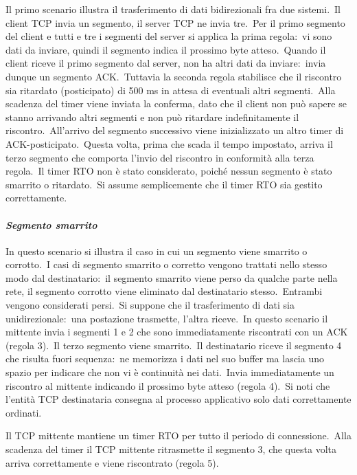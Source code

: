 Il primo scenario illustra il trasferimento di dati bidirezionali fra due sistemi.\
Il client TCP invia un segmento, il server TCP ne invia tre.\
Per il primo segmento del client e tutti e tre i segmenti del server si applica la prima regola:\ vi sono dati da inviare, quindi il segmento indica il prossimo byte atteso.\
Quando il client riceve il primo segmento dal server, non ha altri dati da inviare:\ invia dunque un segmento ACK.\
Tuttavia la seconda regola stabilisce che il riscontro sia ritardato (posticipato) di 500 ms in attesa di eventuali altri segmenti.\
Alla scadenza del timer viene inviata la conferma, dato che il client non può sapere se stanno arrivando altri segmenti e non può ritardare indefinitamente il riscontro.\
All'arrivo del segmento successivo viene inizializzato un altro timer di ACK-posticipato.\
Questa volta, prima che scada il tempo impostato, arriva il terzo segmento che comporta l'invio del riscontro in conformità alla terza regola.\
Il timer RTO non è stato considerato, poiché nessun segmento è stato smarrito o ritardato.\
Si assume semplicemente che il timer RTO sia gestito correttamente.

\paragraph{\emph{Segmento smarrito}}

In questo scenario si illustra il caso in cui un segmento viene smarrito o corrotto.\
I casi di segmento smarrito o corretto vengono trattati nello stesso modo dal destinatario:\ il segmento smarrito viene perso da qualche parte nella rete, il segmento corrotto viene eliminato dal destinatario stesso.\
Entrambi vengono considerati persi.\
Si suppone che il trasferimento di dati sia unidirezionale:\ una postazione trasmette, l'altra riceve.\
In questo scenario il mittente invia i segmenti 1 e 2 che sono immediatamente riscontrati con un ACK (regola 3).\
Il terzo segmento viene smarrito.\
Il destinatario riceve il segmento 4 che risulta fuori sequenza:\ ne memorizza i dati nel suo buffer ma lascia uno spazio per indicare che non vi è continuità nei dati.\
Invia immediatamente un riscontro al mittente indicando il prossimo byte atteso (regola 4).\
Si noti che l'entità TCP destinataria consegna al processo applicativo solo dati correttamente ordinati.\

Il TCP mittente mantiene un timer RTO per tutto il periodo di connessione.\
Alla scadenza del timer il TCP mittente ritrasmette il segmento 3, che questa volta arriva correttamente e viene riscontrato (regola 5).

